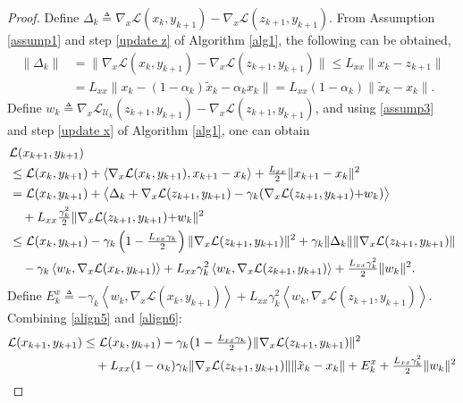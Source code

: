 \documentclass[letterpaper,11 pt]{article}
\def\ml{\mathcal L}
\newcommand{\mor}[1]{{\color{black}#1}}
\newcommand{\zal}[1]{{\color{black}#1}}
\newcommand{\af}[1]{{\color{black}#1}}
\begin{document}
\begin{proof}
Define $\Delta_k\triangleq\nabla_x \ml{(x_k,y_{k+1})}-\nabla_x \ml{(z_{k+1},y_{k+1})}$. From \mor{Assumption \ref{assump1}} and step \ref{update z} of Algorithm \zal{\ref{alg1}}, the following can be obtained,
\begin{align}\label{align5}
\nonumber\|\Delta_k\|&=\|\nabla_x \ml{(x_k,y_{k+1})}-\nabla_x \ml{(z_{k+1},y_{k+1})}\|\leq L_{xx}\|x_k-z_{k+1}\|\\
&=L_{xx}\|x_k-(1-\alpha_k)\tilde x_k-\alpha_k
x_k\|
=L_{xx}(1-\alpha_k)\|\tilde x_k-x_k\|.
\end{align}
\af{Define $w_k\triangleq\nabla_x\ml_{\mathcal U_k}(z_{k+1},y_{k+1})-\nabla_x\ml(z_{k+1},y_{k+1})$}, and using \eqref{assump3} and step \ref{update x} of Algorithm \zal{\ref{alg1}}, one can obtain 
\begin{align}\label {align6}
\nonumber &\ml{(x_{k+1},y_{k+1})}\\
\nonumber&\leq \ml{(x_k,y_{k+1})}+\langle\nabla_x \ml{(x_k,y_{k+1})},x_{k+1}-x_k\rangle+\tfrac{L_{xx}}{ 2}\|x_{k+1}-x_k\|^2\\
\nonumber&=\ml{(x_k,y_{k+1})}+\big\langle \Delta_k+\nabla_x \ml{(z_{k+1},y_{k+1})} -\gamma_k (\nabla_x  \ml{(z_{k+1},y_{k+1})}\af{+w_k})\big\rangle \\ \nonumber&\quad+L_{xx}\tfrac{\gamma_k^2}{ 2}\|\nabla_x\ml{(z_{k+1},y_{k+1})}\af{+w_k}\|^2\\
\nonumber&\leq \ml{(x_k,y_{k+1})}-\gamma_k \left( 1-\tfrac{L_{xx}\gamma_k}{ 2}\right)\|\nabla_x \ml{(z_{k+1},y_{k+1})}\|^2+\gamma_k\|\Delta_k\|\|\nabla_x\ml{(z_{k+1},y_{k+1})}\|
\\
 & \quad -\gamma_k\left\langle w_k,\nabla_x\ml(x_k,y_{k+1})\right\rangle+L_{xx}\gamma_k^2\left\langle w_k,\nabla_x\ml(z_{k+1},y_{k+1})\right\rangle+\tfrac{L_{xx}\gamma_k^2}{2}\|w_k\|^2.
\end{align}
Define 
$E_k^x\triangleq -\gamma_k\left\langle w_k,\nabla_x\ml(x_k,y_{k+1})\right\rangle+L_{xx}\gamma_k^2\left\langle w_k,\nabla_x\ml(z_{k+1},y_{k+1})\right\rangle.$
Combining  \eqref{align5} and \eqref{align6}:
\begin{align}\label{align3}
\nonumber\ml{(x_{k+1},y_{k+1})}&\leq \ml{(x_k,y_{k+1})}-\gamma_k\big( 1-\tfrac{ L_{xx}\gamma_k}{ 2}\big)\|\nabla_x \ml{(z_{k+1},y_{k+1})}\|^2\\\nonumber&\quad+L_{xx}(1-\alpha_k)\gamma_k\| \zal{\nabla_x}\ml{(z_{k+1},y_{k+1})}\|\|\tilde x_k-x_k\|  +E_k^x+\tfrac{L_{xx}\gamma_k^2}{2}\|w_k\|^2\\

\end{align}
\end{proof}
\end{document}
